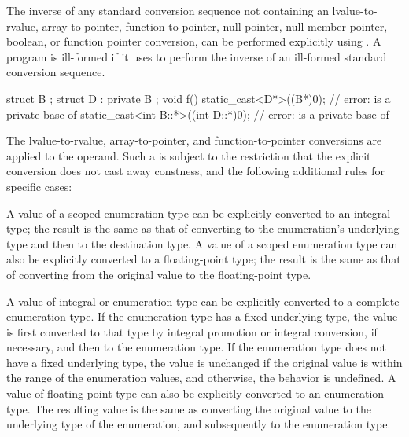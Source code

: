 \pnum
The inverse of any standard conversion sequence not containing an
lvalue-to-rvalue,
array-to-pointer,
function-to-pointer,
null pointer, null member pointer,
boolean, or
function pointer
conversion, can be performed explicitly using . A
program is ill-formed if it uses  to perform the
inverse of an ill-formed standard conversion sequence.
\begin{example}
\begin{codeblock}
struct B { };
struct D : private B { };
void f() {
  static_cast<D*>((B*)0);               // error:  is a private base of 
  static_cast<int B::*>((int D::*)0);   // error:  is a private base of 
}
\end{codeblock}
\end{example}

\pnum
The lvalue-to-rvalue,
array-to-pointer, and
function-to-pointer conversions are applied to the
operand. Such a  is subject to the restriction that
the explicit conversion does not cast away
constness, and the following additional rules
for specific cases:

\pnum
A value of a scoped enumeration type
can be explicitly converted to an integral type;
the result is the same as that of converting
to the enumeration's underlying type and then to the destination type.
A value of a scoped enumeration type
can also be explicitly converted to a floating-point type;
the result is the same as that of converting
from the original value to the floating-point type.

\pnum
{}%
%
A value of integral or enumeration type can be explicitly converted to
a complete enumeration type.
If the enumeration type has a fixed underlying type,
the value is first converted to that type
by
integral promotion or integral conversion,
if necessary, and
then to the enumeration type.
If the enumeration type does not have a fixed underlying type,
the value is unchanged
if the original value is within the range
of the enumeration values, and
otherwise, the behavior is undefined.
A value of floating-point type can also be explicitly converted to an enumeration type.
The resulting value is the same as converting the original value to the
underlying type of the enumeration, and subsequently to
the enumeration type.

